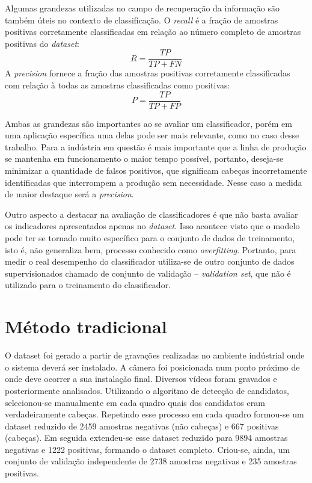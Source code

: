 Algumas grandezas utilizadas no campo de recuperação da informação \cite{inforetrival} são também úteis no contexto de classificação. O \textit{recall} é a fração de amostras positivas corretamente classificadas em relação ao número completo de amostras positivas do \textit{dataset}:
\begin{equation}
R = \frac{TP}{TP+FN}
\end{equation}
A \textit{precision} fornece a fração das amostras positivas corretamente classificadas com relação à todas as amostras classificadas como positivas:
\begin{equation}
P = \frac{TP}{TP+FP}
\end{equation}

Ambas as grandezas são importantes ao se avaliar um classificador, porém em uma aplicação específica uma delas pode ser mais relevante, como no caso desse trabalho. Para a indústria em questão é mais importante que a linha de produção se mantenha em funcionamento o maior tempo possível, portanto, deseja-se minimizar a quantidade de falsos positivos, que significam cabeças incorretamente identificadas que interrompem a produção sem necessidade. Nesse caso a medida de maior destaque será a \textit{precision}.

Outro aspecto a destacar na avaliação de classificadores é que não basta avaliar os indicadores apresentados apenas no \textit{dataset}. Isso acontece visto que o modelo pode ter se tornado muito específico para o conjunto de dados de treinamento, isto é, não generaliza bem, processo conhecido como \textit{overfitting}. Portanto, para medir o real desempenho do classificador utiliza-se de outro conjunto de dados supervisionados chamado de conjunto de validação -- \textit{validation set}, que não é utilizado para o treinamento do classificador.

\section{Método tradicional}
O dataset foi gerado a partir de gravações realizadas no ambiente indústrial onde o sistema deverá ser instalado. A câmera foi posicionada num ponto próximo de onde deve ocorrer a sua instalação final. Diversos vídeos foram gravados e posteriormente analisados. Utilizando o algoritmo de detecção de candidatos, selecionou-se manualmente em cada quadro quais dos candidatos eram verdadeiramente cabeças. Repetindo esse processo em cada quadro formou-se um dataset reduzido de 2459 amostras negativas (não cabeças) e 667 positivas (cabeças). Em seguida extendeu-se esse dataset reduzido para 9894 amostras negativas e 1222 positivas, formando o dataset completo. Criou-se, ainda, um conjunto de validação independente de 2738 amostras negativas e 235 amostras positivas.

